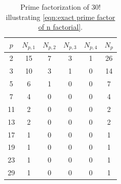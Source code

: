 \documentclass[english, parskip=full]{scrartcl}
\begin{document}
\begin{table}[!ht]
\centering
\begin{tabular}{|*{6}{c|}}\hline
$p$ & $N_{p,1}$ & $N_{p,2}$ & $N_{p,3}$ & $N_{p,4}$ & $N_p$ \\ \hline
2 & 15 & 7 & 3 & 1 & 26 \\ \hline
3 & 10 & 3 & 1 & 0 & 14 \\ \hline
5 & 6 & 1 & 0 & 0 & 7 \\ \hline
7 & 4 & 0 & 0 & 0 & 4 \\ \hline
11 & 2 & 0 & 0 & 0 & 2 \\ \hline
13 & 2 & 0 & 0 & 0 & 2 \\ \hline
17 & 1 & 0 & 0 & 0 & 1 \\ \hline
19 & 1 & 0 & 0 & 0 & 1 \\ \hline
23 & 1 & 0 & 0 & 0 & 1 \\ \hline
29 & 1 & 0 & 0 & 0 & 1 \\ \hline
\end{tabular}
\caption{Prime factorization of $30!$ illustrating \autoref{eqn:exact prime factor of n factorial}.}
\label{table:exact prime factor example 30fac}
\end{table}
\end{document}
